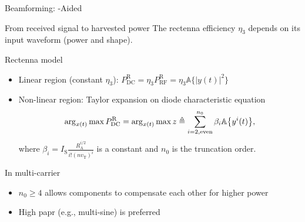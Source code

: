\documentclass[presentation,xcolor={table},9pt]{beamer}
\begin{document}
\begin{section}{Beamforming: -Aided }
	\begin{frame}{From received signal to harvested power}
		The rectenna efficiency $\eta_3$ depends on its input waveform (power and shape).
		\begin{block}{Rectenna model}
			\begin{itemize}
				\item Linear region (constant $\eta_3$): $P_{\mathrm{DC}}^\mathrm{R} = \eta_3 P_\mathrm{RF}^\mathrm{R} = \eta_3 \mathbb{A}\bigl\{ \lvert y(t) \rvert^2 \bigr\}$
				\item Non-linear region: Taylor expansion on diode characteristic equation
				\vspace{-0.25cm}
				\begin{equation*}
					\arg_{x(t)} \max P_{\mathrm{DC}}^\mathrm{R} = \arg_{x(t)} \max z \triangleq \sum_{i=2,\text{even}}^{n_0} \beta_i \mathbb{A}\bigl\{ y^i(t) \bigr\},
					\vspace{-0.5cm}
				\end{equation*}
				where $\beta_i = I_\mathrm{S} \frac{R_\mathrm{A}^{i/2}}{i!(n v_\mathrm{T})^i}$ is a constant and $n_0$ is the truncation order.
			\end{itemize}
		\end{block}
		\begin{alertblock}{In multi-carrier  \textellipsis}
			\begin{itemize}
				\item $n_0 \ge 4$ allows components to compensate each other for higher  power
				\item High \gls{papr} (e.g., multi-sine) is preferred \cite{Trotter2009}
			\end{itemize}
			\vspace{-0.5cm}
			\begin{figure}
				\centering
\end{figure}
\end{alertblock}
\end{frame}
\end{section}
\end{document}
